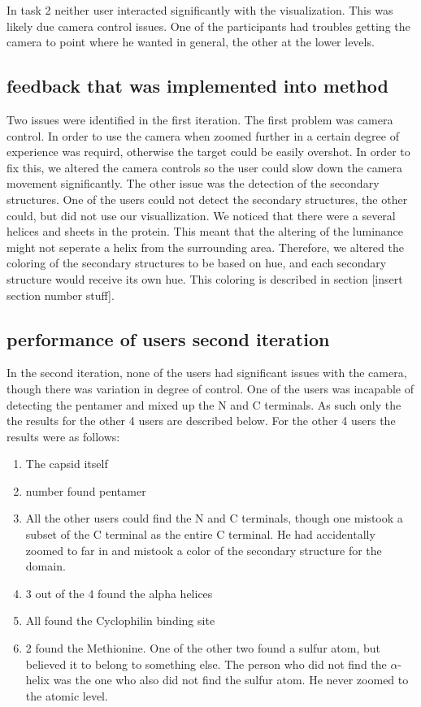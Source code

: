 \documentclass[review,journal]{vgtc}         %
\begin{document}
In task 2 neither user interacted significantly with the visualization. This was likely due camera control issues. One of the participants had troubles getting the camera to point where he wanted in general, the other at the lower levels.

\subsection{feedback that was implemented into method}
Two issues were identified in the first iteration. The first problem was camera control. 
In order to use the camera when zoomed further in a certain degree of experience was requird, otherwise the target could be easily overshot. In order to fix this, we altered the camera controls so the user could slow down the camera movement significantly.
The other issue was the detection of the secondary structures. One of the users could not detect the secondary structures, the other could, but did not use our visuallization. We noticed that there were a several helices and sheets in the protein. This meant that the altering of the luminance might not seperate a helix from the surrounding area. Therefore, we altered the coloring of the secondary structures to be based on hue, and each secondary structure would receive its own hue. This coloring is described in section [insert section number stuff].


\subsection{performance of users second iteration}
In the second iteration, none of the users had significant issues with the camera, though there was variation in degree of control.
One of the users was incapable of detecting the pentamer and mixed up the N and C terminals. As such only the the results for the other 4 users are described below. For the other 4 users the results were as follows:

\begin{enumerate}
	\item The capsid itself
	\item number found pentamer
	\item All the other users could find the N and C terminals, though one mistook a subset of the C terminal as the entire C terminal. He had accidentally zoomed to far in and mistook a color of the secondary structure for the domain.
	\item 3 out of the 4 found the alpha helices
	\item All found the Cyclophilin binding site
	\item 2 found the Methionine. One of the other two found a sulfur atom, but believed it to belong to something else. The person who did not find the $\alpha$-helix was the one who also did not find the sulfur atom. He never zoomed to the atomic level.
\end{enumerate}
\end{document}
